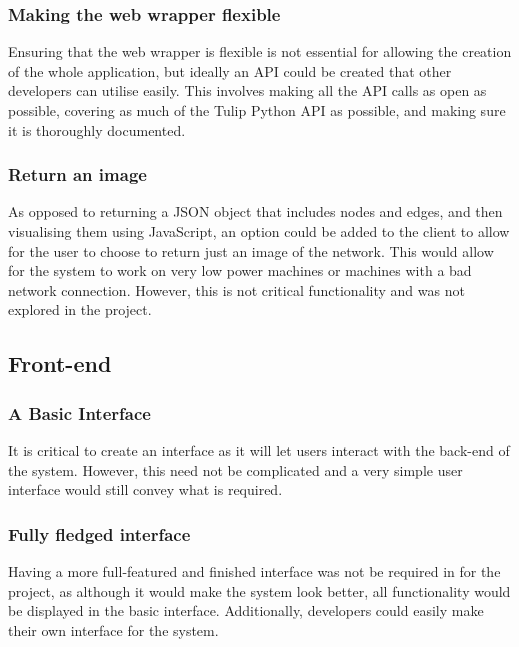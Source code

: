 \documentclass[../dissertation.tex]{subfiles}
\begin{document}
\subsubsection{Making the web wrapper flexible}

Ensuring that the web wrapper is flexible is not essential for allowing the creation of the whole application, but ideally an API could be created that other developers can utilise easily. This involves making all the API calls as open as possible, covering as much of the Tulip Python API as possible, and making sure it is thoroughly documented. 

\subsubsection{Return an image}

As opposed to returning a JSON object that includes nodes and edges, and then visualising them using JavaScript, an option could be added to the client to allow for the user to choose to return just an image of the network. This would allow for the system to work on very low power machines or machines with a bad network connection. However, this is not critical functionality and was not explored in the project.

\subsection{Front-end}

\subsubsection{A Basic Interface}

It is critical to create an interface as it will let users interact with the back-end of the system. However, this need not be complicated and a very simple user interface would still convey what is required.

\subsubsection{Fully fledged interface}

Having a more full-featured and finished interface was not be required in for the project, as although it would make the system look better, all functionality would be displayed in the basic interface. Additionally, developers could easily make their own interface for the system.
\end{document}
